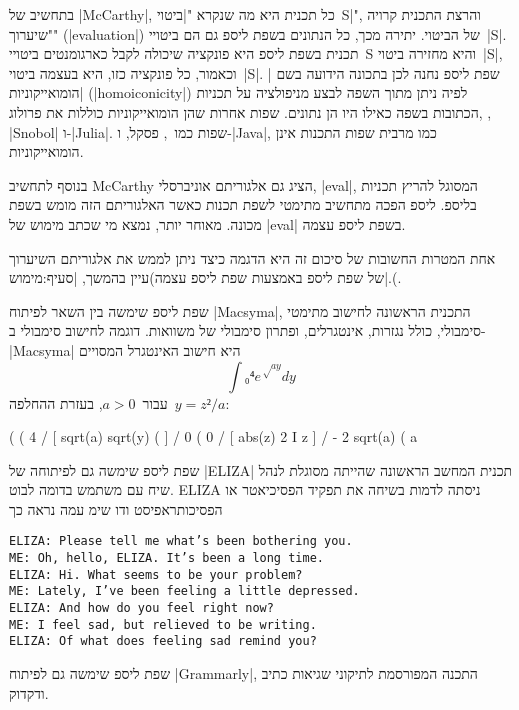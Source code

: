בתחשיב של \E|McCarthy|, כל תכנית היא מה שנקרא "\ע|ביטוי~S|", והרצת התכנית קרויה
"שיערוך" (\E|evaluation|) של הביטוי. יתירה מכך, כל הנתונים בשפת ליספ גם הם
ביטויי~\E|S|. תכנית בשפת ליספ היא פונקציה שיכולה לקבל כארגומנטים ביטויי~S והיא
מחזירה ביטוי~\E|S|, וכאמור, כל פונקציה כזו, היא בעצמה ביטוי~\E|S|. שפת ליספ
נחנה לכן בתכונה הידועה בשם \ע|הומואייקוניות| (\E|homoiconicity|) לפיה ניתן מתוך
השפה לבצע מניפולציה על תכניות הכתובות בשפה כאילו היו הן נתונים. שפות אחרות שהן
הומואייקוניות כוללות את פרולוג, , \E|Snobol|
ו-\E|Julia|. שפות כמו~\CPL, פסקל, ו-\E|Java|, כמו מרבית שפות התכנות אינן
הומואייקוניות.

בנוסף לתחשיב McCarthy הציג גם אלגוריתם אוניברסלי, \E|eval|, המסוגל להריץ תכניות
בליספ. ליספ הפכה מתחשיב מתימטי לשפת תכנות כאשר האלגוריתם הזה מומש בשפת מכונה.
מאוחר יותר, נמצא מי שכתב מימוש של \E|eval| בשפת ליספ עצמה.

אחת המטרות החשובות של סיכום זה היא הדגמה כיצד ניתן לממש את אלגוריתם השיערוך של
שפת ליספ באמצעות שפת ליספ עצמה)עיין בהמשך, |סעיף:מימוש|.(.

שפת ליספ שימשה בין השאר לפיתוח \E|Macsyma|, התכנית הראשונה לחישוב מתימטי
סימבולי, כולל נגזרות, אינטגרלים, ופתרון סימבולי של משוואות.
דוגמה לחישוב סימבולי ב-\E|Macsyma| היא חישוב האינטגרל המסויים \[
  ∫₀⁴ e^{√{ay}}dy
\] עבור~$a>0$, בעזרת ההחלפה~$y=z²/a$:

\minipage\textwidth
\scriptsize
\begin{LISP}
(%
(%
                      4
                     /
                     [ sqrt(a) sqrt(y) (%
                     ]
                     /
                      0
(%
                      0
                     /
                     [ abs(z)
                   2 I z %
                     ]
                     /
- 2 sqrt(a)
(%
                                a
\end{LISP}
\endminipage

שפת ליספ שימשה גם לפיתוחה של \E|ELIZA| תכנית המחשב הראשונה שהייתה מסוגלת לנהל
שיח עם משתמש בדומה לבוט. ELIZA ניסתה לדמות בשיחה את תפקיד הפסיכיאטר או
הפסיכותראפיסט ודו שימ עמה נראה כך

\begin{minipage}\textwidth
  \begin{LTR}
    \scriptsize
    \begin{verbatim}
ELIZA: Please tell me what’s been bothering you.
ME: Oh, hello, ELIZA. It’s been a long time.
ELIZA: Hi. What seems to be your problem?
ME: Lately, I’ve been feeling a little depressed.
ELIZA: And how do you feel right now?
ME: I feel sad, but relieved to be writing.
ELIZA: Of what does feeling sad remind you?
\end{verbatim}
  \end{LTR}
\end{minipage}
שפת ליספ שימשה גם לפיתוח
\E|Grammarly|, התכנה המפורסמת לתיקוני שגיאות כתיב ודקדוק.

